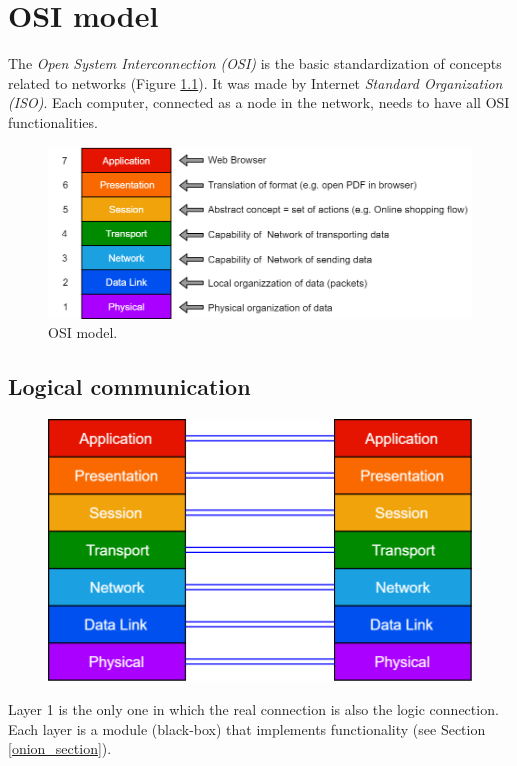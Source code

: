 \chapter{OSI model}
The \textit{Open System Interconnection (OSI)} is the basic standardization of concepts related to networks (Figure \ref{OSI}). It was made by Internet \textit{Standard Organization (ISO)}. Each computer, connected as a node in the network, needs to have all OSI functionalities.
\begin{figure}[h]
\centering
\includegraphics[scale=0.4]{Images/OSI/OSI}\caption{\footnotesize{OSI model.}}\label{OSI}
\end{figure}

\section{Logical communication}
\begin{figure}[h]
\centering
\includegraphics[scale=0.3]{Images/OSI/logic}
\end{figure}
Layer 1 is the only one in which the real connection is also the logic connection. Each layer is a module (black-box) that implements functionality (see Section \ref{onion_section}).

